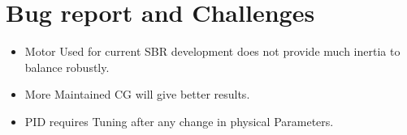 \documentclass[12pt,a4paper,oneside]{book}
\begin{document}

	\section*{Bug report and Challenges}
		\begin{itemize}
    			\item Motor Used for current SBR development does not provide much inertia to balance robustly.
			\item More Maintained CG will give better results.
			\item PID requires Tuning after any change in physical Parameters.
  \end{itemize}
	
\end{document}
